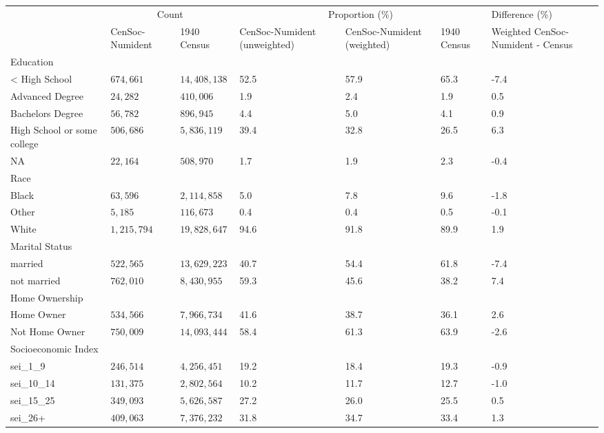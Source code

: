\captionsetup[table]{labelformat=empty,skip=1pt}
\begin{longtable}{lllllll}
\toprule
 & \multicolumn{2}{c}{Count} & \multicolumn{3}{c}{Proportion (\%)} & Difference (\%) \\ 
 \cmidrule(lr){2-3} \cmidrule(lr){4-6} \cmidrule(lr){7-7}
 & CenSoc-Numident & 1940 Census & CenSoc-Numident (unweighted) & CenSoc-Numident (weighted) & 1940 Census & Weighted CenSoc-Numident - Census \\ 
\midrule
\multicolumn{1}{l}{Education} \\ 
\midrule
< High School & $674,661$ & $14,408,138$ & 52.5 & 57.9 & 65.3 & -7.4 \\ 
Advanced Degree & $24,282$ & $410,006$ & 1.9 & 2.4 & 1.9 & 0.5 \\ 
Bachelors Degree & $56,782$ & $896,945$ & 4.4 & 5.0 & 4.1 & 0.9 \\ 
High School or some college & $506,686$ & $5,836,119$ & 39.4 & 32.8 & 26.5 & 6.3 \\ 
NA & $22,164$ & $508,970$ & 1.7 & 1.9 & 2.3 & -0.4 \\ 
\midrule
\multicolumn{1}{l}{Race} \\ 
\midrule
Black & $63,596$ & $2,114,858$ & 5.0 & 7.8 & 9.6 & -1.8 \\ 
Other & $5,185$ & $116,673$ & 0.4 & 0.4 & 0.5 & -0.1 \\ 
White & $1,215,794$ & $19,828,647$ & 94.6 & 91.8 & 89.9 & 1.9 \\ 
\midrule
\multicolumn{1}{l}{Marital Status} \\ 
\midrule
married & $522,565$ & $13,629,223$ & 40.7 & 54.4 & 61.8 & -7.4 \\ 
not married & $762,010$ & $8,430,955$ & 59.3 & 45.6 & 38.2 & 7.4 \\ 
\midrule
\multicolumn{1}{l}{Home Ownership} \\ 
\midrule
Home Owner & $534,566$ & $7,966,734$ & 41.6 & 38.7 & 36.1 & 2.6 \\ 
Not Home Owner & $750,009$ & $14,093,444$ & 58.4 & 61.3 & 63.9 & -2.6 \\ 
\midrule
\multicolumn{1}{l}{Socioeconomic Index} \\ 
\midrule
sei\_1\_9 & $246,514$ & $4,256,451$ & 19.2 & 18.4 & 19.3 & -0.9 \\ 
sei\_10\_14 & $131,375$ & $2,802,564$ & 10.2 & 11.7 & 12.7 & -1.0 \\ 
sei\_15\_25 & $349,093$ & $5,626,587$ & 27.2 & 26.0 & 25.5 & 0.5 \\ 
sei\_26+ & $409,063$ & $7,376,232$ & 31.8 & 34.7 & 33.4 & 1.3 \\ 

\end{longtable}
